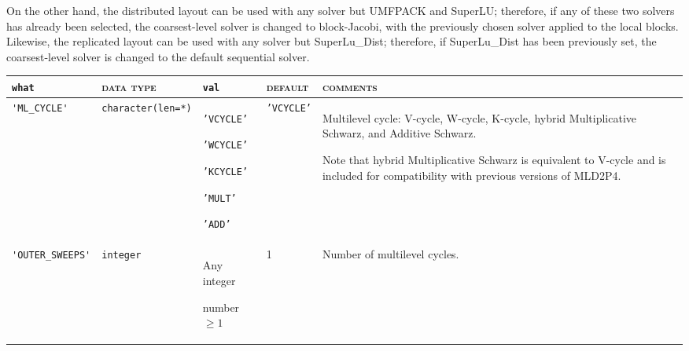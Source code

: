 On the other hand, the distributed layout can be used with any solver
but UMFPACK and SuperLU; therefore, if any of these two solvers has already
been selected, the coarsest-level solver is changed to block-Jacobi,
with the previously chosen solver applied to the local blocks.
Likewise, the replicated layout can be used with any solver but SuperLu\_Dist;
therefore, if SuperLu\_Dist has been previously set, the coarsest-level
solver is changed to the default sequential solver.



\bsideways
\begin{center}
\begin{tabular}{|p{3.6cm}|l|p{2.4cm}|p{2.4cm}|p{7.2cm}|}
\hline
\verb|what|              & \textsc{data type}        &  \verb|val|      &  \textsc{default}  &
\textsc{comments} \\ \hline
\verb|'ML_CYCLE'|     & \verb|character(len=*)|
                         & \texttt{'VCYCLE'} \par \texttt{'WCYCLE'}   \par \texttt{'KCYCLE'} \par
                             \texttt{'MULT'} \par \texttt{'ADD'}
                         & \texttt{'VCYCLE'}
                         &Multilevel cycle: V-cycle, W-cycle, K-cycle, hybrid Multiplicative Schwarz,
                           and Additive Schwarz. \par
                           Note that hybrid Multiplicative Schwarz is equivalent to V-cycle and
                           is included for compatibility with previous versions of MLD2P4. \\ \hline
 \verb|'OUTER_SWEEPS'| & \texttt{integer} &
                           Any integer \par number $\ge 1$  & 1 &
                           Number of multilevel cycles. \\ \hline

\end{tabular}
\end{center}

